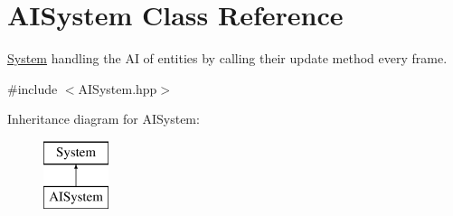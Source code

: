 \hypertarget{class_a_i_system}{}\section{A\+I\+System Class Reference}
\label{class_a_i_system}


\hyperlink{class_system}{System} handling the AI of entities by calling their update method every frame.  




{\ttfamily \#include $<$A\+I\+System.\+hpp$>$}

Inheritance diagram for A\+I\+System\+:\begin{figure}[H]
\begin{center}
\leavevmode
\includegraphics[height=2.000000cm]{class_a_i_system}
\end{center}
\end{figure}
